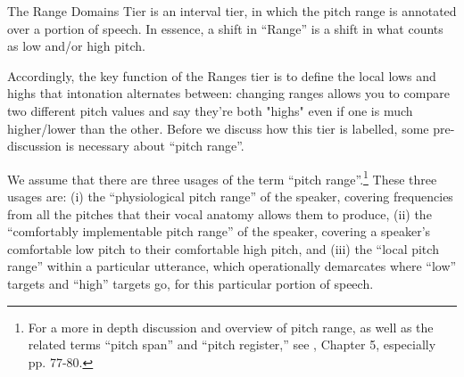 \documentclass[11pt, twoside]{memoir}
\begin{document}
The Range Domains Tier is an interval tier, in which the pitch range is annotated over a portion of speech. In essence, a shift in “Range” is a shift in what counts as low and/or high pitch.

Accordingly, the key function of the Ranges tier is to define the local lows and highs that intonation alternates between: changing ranges allows you to compare two different pitch values and say they’re both "highs" even if one is much higher\slash lower than the other. Before we discuss how this tier is labelled, some pre-discussion is necessary about “pitch range”.

We assume that there are three usages of the term “pitch range”.\footnote{For a more in depth discussion and overview of pitch range, as well as the related terms “pitch span” and “pitch register,” see \citealt{gussenhoven04}, Chapter 5, especially pp. 77-80.} These three usages are: (i) the “physiological pitch range” of the speaker, covering frequencies from all the pitches that their vocal anatomy allows them to produce, (ii) the “comfortably implementable pitch range” of the speaker, covering a speaker’s comfortable low pitch to their comfortable high pitch, and (iii) the “local pitch range” within a particular utterance, which operationally demarcates where “low” targets and “high” targets go, for this particular portion of speech.
\end{document}
